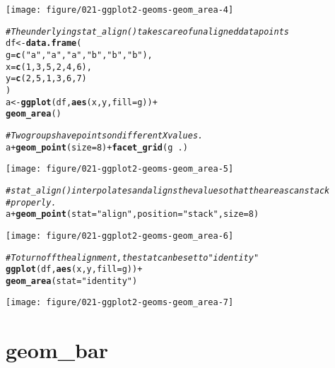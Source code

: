 \documentclass[a4paper,titlepage]{tufte-handout}\usepackage[]{graphicx}\usepackage[]{xcolor}
\makeatletter
\def\maxwidth{ %
  \ifdim\Gin@nat@width>\linewidth
    \linewidth
  \else
    \Gin@nat@width
  \fi
}
\newcommand{\hlnum}[1]{\textcolor[rgb]{0.686,0.059,0.569}{#1}}%
\newcommand{\hlsng}[1]{\textcolor[rgb]{0.192,0.494,0.8}{#1}}%
\newcommand{\hlcom}[1]{\textcolor[rgb]{0.678,0.584,0.686}{\textit{#1}}}%
\newcommand{\hlopt}[1]{\textcolor[rgb]{0,0,0}{#1}}%
\newcommand{\hldef}[1]{\textcolor[rgb]{0.345,0.345,0.345}{#1}}%
\newcommand{\hlkwb}[1]{\textcolor[rgb]{0.69,0.353,0.396}{#1}}%
\newcommand{\hlkwc}[1]{\textcolor[rgb]{0.333,0.667,0.333}{#1}}%
\newcommand{\hlkwd}[1]{\textcolor[rgb]{0.737,0.353,0.396}{\textbf{#1}}}%
\newenvironment{kframe}{%
 \def\at@end@of@kframe{}%
 \ifinner\ifhmode%
  \def\at@end@of@kframe{\end{minipage}}%
  \begin{minipage}{\columnwidth}%
 \fi\fi%
 \def\FrameCommand##1{\hskip\@totalleftmargin \hskip-\fboxsep
 \colorbox{shadecolor}{##1}\hskip-\fboxsep
     \hskip-\linewidth \hskip-\@totalleftmargin \hskip\columnwidth}%
 \MakeFramed {\advance\hsize-\width
   \@totalleftmargin\z@ \linewidth\hsize
   \@setminipage}}%
 {\par\unskip\endMakeFramed%
 \at@end@of@kframe}
\newenvironment{knitrout}{}{} %
\makeatother
\begin{document}
\begin{knitrout}
\texttt{[image: figure/021-ggplot2-geoms-geom\_area-4]} 
\begin{kframe}\begin{alltt}
\hlcom{# The underlying stat_align() takes care of unaligned data points}
\hldef{df} \hlkwb{<-} \hlkwd{data.frame}\hldef{(}
  \hlkwc{g} \hldef{=} \hlkwd{c}\hldef{(}\hlsng{"a"}\hldef{,} \hlsng{"a"}\hldef{,} \hlsng{"a"}\hldef{,} \hlsng{"b"}\hldef{,} \hlsng{"b"}\hldef{,} \hlsng{"b"}\hldef{),}
  \hlkwc{x} \hldef{=} \hlkwd{c}\hldef{(}\hlnum{1}\hldef{,} \hlnum{3}\hldef{,} \hlnum{5}\hldef{,} \hlnum{2}\hldef{,} \hlnum{4}\hldef{,} \hlnum{6}\hldef{),}
  \hlkwc{y} \hldef{=} \hlkwd{c}\hldef{(}\hlnum{2}\hldef{,} \hlnum{5}\hldef{,} \hlnum{1}\hldef{,} \hlnum{3}\hldef{,} \hlnum{6}\hldef{,} \hlnum{7}\hldef{)}
\hldef{)}
\hldef{a} \hlkwb{<-} \hlkwd{ggplot}\hldef{(df,} \hlkwd{aes}\hldef{(x, y,} \hlkwc{fill} \hldef{= g))} \hlopt{+}
  \hlkwd{geom_area}\hldef{()}

\hlcom{# Two groups have points on different X values.}
\hldef{a} \hlopt{+} \hlkwd{geom_point}\hldef{(}\hlkwc{size} \hldef{=} \hlnum{8}\hldef{)} \hlopt{+} \hlkwd{facet_grid}\hldef{(g} \hlopt{~} \hldef{.)}
\end{alltt}
\end{kframe}
\texttt{[image: figure/021-ggplot2-geoms-geom\_area-5]} 
\begin{kframe}\begin{alltt}
\hlcom{# stat_align() interpolates and aligns the value so that the areas can stack}
\hlcom{# properly.}
\hldef{a} \hlopt{+} \hlkwd{geom_point}\hldef{(}\hlkwc{stat} \hldef{=} \hlsng{"align"}\hldef{,} \hlkwc{position} \hldef{=} \hlsng{"stack"}\hldef{,} \hlkwc{size} \hldef{=} \hlnum{8}\hldef{)}
\end{alltt}
\end{kframe}
\texttt{[image: figure/021-ggplot2-geoms-geom\_area-6]} 
\begin{kframe}\begin{alltt}
\hlcom{# To turn off the alignment, the stat can be set to "identity"}
\hlkwd{ggplot}\hldef{(df,} \hlkwd{aes}\hldef{(x, y,} \hlkwc{fill} \hldef{= g))} \hlopt{+}
  \hlkwd{geom_area}\hldef{(}\hlkwc{stat} \hldef{=} \hlsng{"identity"}\hldef{)}
\end{alltt}
\end{kframe}
\texttt{[image: figure/021-ggplot2-geoms-geom\_area-7]} 
\end{knitrout}


\section{geom\_bar}
\end{document}
